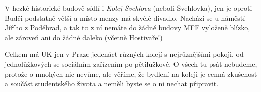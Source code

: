 V hezké historické budově sídlí i \textit{Kolej Švehlova} (neboli Švehlovka),
jen je oproti Budči podstatně větší a místo menzy má skvělé divadlo. Nachází se
u náměstí Jiřího z Poděbrad, a tak to z ní nemáte do žádné budovy MFF vyloženě
blízko, ale zároveň ani do žádné daleko (včetně Hostivaře!)

Celkem má UK jen v Praze jedenáct různých kolejí s nejrůznějšími pokoji, od
jednolůžkových se sociálním zařízením po pětilůžkové. O všech tu psát nebudeme,
protože o mnohých nic nevíme, ale věříme, že bydlení na koleji je cenná
zkušenost a součást studentského života a neměli byste se o ni nechat připravit.